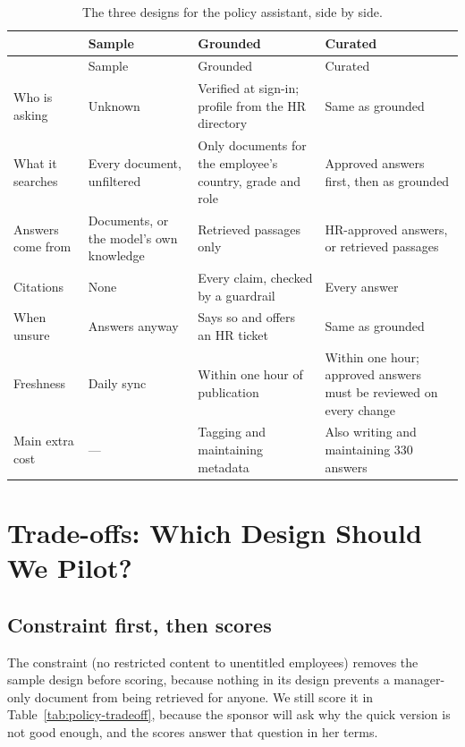 \begingroup
\small
\begin{xltabular}{\textwidth}{@{}>{\raggedright\arraybackslash}p{2.3cm}>{\raggedright\arraybackslash}X>{\raggedright\arraybackslash}X>{\raggedright\arraybackslash}X@{}}
\caption{The three designs for the policy assistant, side by side.}\label{tab:policy-designs}\\
\toprule
{} & Sample & Grounded & Curated \\
\midrule
\endfirsthead
\toprule
{} & Sample & Grounded & Curated \\
\midrule
\endhead
Who is asking & Unknown & Verified at sign-in; profile from the HR directory & Same as grounded \\
What it searches & Every document, unfiltered & Only documents for the employee's country, grade and role & Approved answers first, then as grounded \\
Answers come from & Documents, or the model's own knowledge & Retrieved passages only & HR-approved answers, or retrieved passages \\
Citations & None & Every claim, checked by a guardrail & Every answer \\
When unsure & Answers anyway & Says so and offers an HR ticket & Same as grounded \\
Freshness & Daily sync & Within one hour of publication & Within one hour; approved answers must be reviewed on every change \\
Main extra cost & --- & Tagging and maintaining metadata & Also writing and maintaining 330 answers \\
\bottomrule
\end{xltabular}
\endgroup

\section{Trade-offs: Which Design Should We Pilot?}
\label{sec:policy-tradeoffs}

\subsection{Constraint first, then scores}

The constraint  (no restricted content to unentitled employees) removes the sample design before scoring, because nothing in its design prevents a manager-only document from being retrieved for anyone. We still score it in Table~\ref{tab:policy-tradeoff}, because the sponsor will ask why the quick version is not good enough, and the scores answer that question in her terms.

